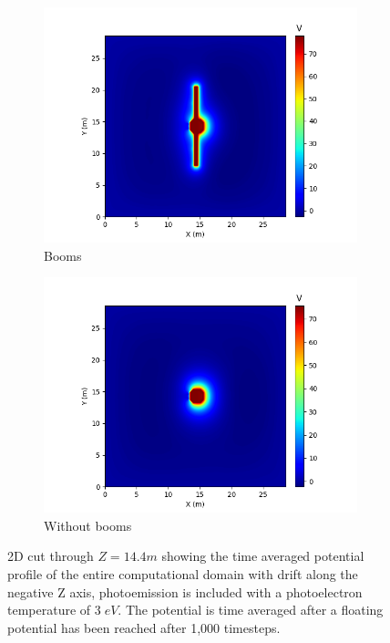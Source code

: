 \begin{figure}[H]
  \begin{subfigure}[b]{0.6\textwidth}
    \includegraphics[width=\textwidth]{figures/MMO/PHTemp/WB/P_PHTemp_WB.png}
    \caption{Booms}
    \label{fig:P_PHTemp_WB}
  \end{subfigure}
  \hfill
  \begin{subfigure}[b]{0.6\textwidth}
    \includegraphics[width=\textwidth]{figures/MMO/PHTemp/NB/P_PHTemp_NB.png}
    \caption{Without booms}
    \label{fig:P_PHTemp_NB}
  \end{subfigure}
  \label{fig:Pot_PHTemp}
  \caption{2D cut through $Z = 14.4 m$ showing the time averaged potential profile of the entire computational domain with drift along the negative Z axis, photoemission is included with a photoelectron temperature of $3 \; eV$. The potential is time averaged after a floating potential has been reached after 1,000 timesteps.}
\end{figure}

